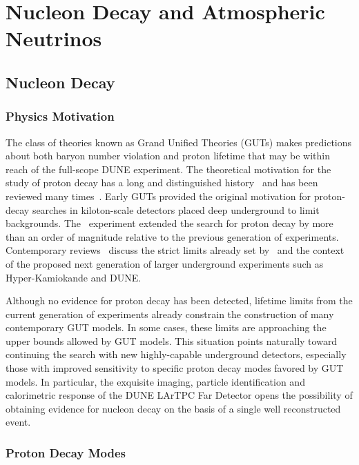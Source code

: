 \chapter{Nucleon Decay and Atmospheric Neutrinos}
\label{ch:physics-atmpdk}

\section{Nucleon Decay}
\label{sec:physics-atmpdk-ndk}

\subsection{Physics Motivation}
The class of theories known as Grand Unified Theories (GUTs) makes
predictions about both baryon number violation and proton lifetime
that may be within reach of the full-scope DUNE experiment.
%
The theoretical motivation for the study of proton decay has a long and
distinguished history~\cite{Pati:1973rp,Georgi:1974sy,Dimopoulos:1981dw} and
has been reviewed many times~\cite{Langacker:1980js,deBoer:1994dg,Nath:2006ut}.
%
Early GUTs provided the original motivation for proton-decay searches in
kiloton-scale detectors placed deep underground to limit backgrounds.  The
 \superk\ experiment extended the search for proton decay by more
than an order of magnitude relative to the previous generation of experiments.
%
Contemporary reviews~\cite{Raby:2008pd,Senjanovic:2009kr,Li:2010dp} discuss the
strict limits already set by \superk\ and the context of the proposed next
generation of larger underground
experiments such as Hyper-Kamiokande and DUNE.

Although no evidence for proton decay has been detected, lifetime
limits from the current generation of experiments already constrain
the construction of many contemporary GUT models. 
In some cases, these limits are approaching the upper bounds allowed 
by GUT models.  This situation points naturally toward continuing 
the search with new highly-capable underground detectors, especially those 
with improved sensitivity to specific proton decay modes favored by GUT models.
In particular, the exquisite imaging, particle identification and calorimetric 
response of the DUNE LArTPC Far Detector opens the possibility of obtaining 
evidence for nucleon decay on the basis of a single well reconstructed event.

\subsection{Proton Decay Modes} 

